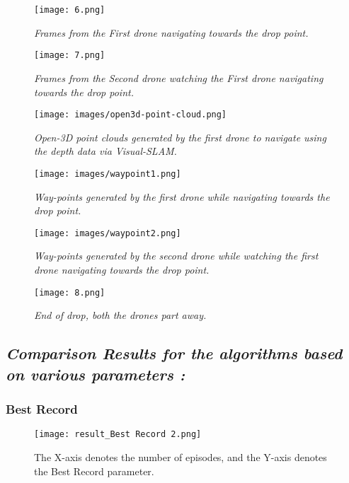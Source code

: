 \documentclass[preprint,12pt]{elsarticle}
\begin{document}
\graphicspath{ {./images/} }
\begin{figure}[!htbp]
  \centering
  \texttt{[image: 6.png]}
  \caption{\textit{Frames from the First drone navigating towards the drop point.}}
  \label{fig:8}
\end{figure}

\graphicspath{ {./images/} }
\begin{figure}[!htbp]
  \centering
  \texttt{[image: 7.png]}
  \caption{\textit{Frames from the Second drone watching the First drone navigating towards the drop point.}}
  \label{fig:8}
\end{figure}

\graphicspath{ {./images/} }
\begin{figure}[!htbp]
  \centering
  \texttt{[image: images/open3d-point-cloud.png]}
  \caption{\textit{Open-3D point clouds generated by the first drone to navigate using the  depth data via Visual-SLAM.}}
  \label{fig:8}
\end{figure}

\graphicspath{ {./images/} }
\begin{figure}[!htbp]
  \centering
  \texttt{[image: images/waypoint1.png]}
  \caption{\textit{Way-points generated by the first drone while navigating towards the drop point.}}
  \label{fig:8}
\end{figure}

\graphicspath{ {./images/} }
\begin{figure}[!htbp]
  \centering
  \texttt{[image: images/waypoint2.png]}
  \caption{\textit{Way-points generated by the second drone while watching the first drone navigating towards the drop point.}}
  \label{fig:8}
\end{figure}

\graphicspath{ {./images/} }
\begin{figure}[!htbp]
  \centering
  \texttt{[image: 8.png]}
  \caption{\textit{End of drop, both the drones part away.}}
  \label{fig:8}
\end{figure}

\subsection{\textbf{\textit{Comparison Results for the algorithms based on various parameters : }}}

\subsubsection{Best Record}
\begin{figure}[!htbp]
  \centering
  \texttt{[image: result\_Best Record 2.png]}
  \caption{The X-axis denotes the number of episodes, and the Y-axis denotes the Best Record parameter.}
  \label{fig:best-record}
\end{figure}
\end{document}
